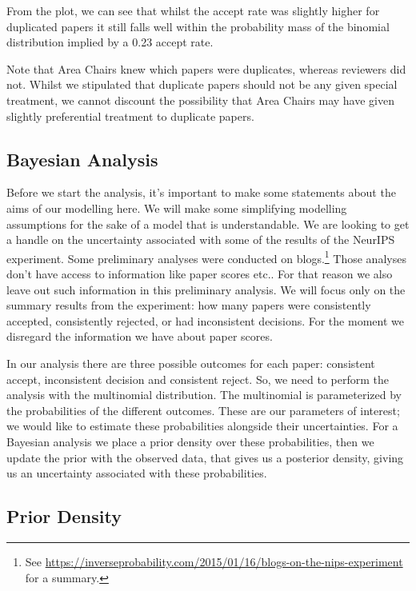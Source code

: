 From the plot, we can see that whilst the accept rate was slightly
higher for duplicated papers it still falls well within the 
probability mass of the binomial distribution implied by a 0.23 accept rate.

Note that Area Chairs knew which papers were duplicates, whereas
reviewers did not. Whilst we stipulated that duplicate papers should not
be any given special treatment, we cannot discount the possibility that
Area Chairs may have given slightly preferential treatment to duplicate
papers.

\subsection{Bayesian Analysis}\label{bayesian-analysis}

Before we start the analysis, it's important to make some statements
about the aims of our modelling here. We will make some simplifying
modelling assumptions for the sake of a model that is understandable. We
are looking to get a handle on the uncertainty associated with some of
the results of the NeurIPS experiment.
Some
preliminary analyses were conducted on blogs.\footnote{See \url{https://inverseprobability.com/2015/01/16/blogs-on-the-nips-experiment} for a summary.} Those
analyses don't have access to information like paper scores etc.. For
that reason we also leave out such information in this preliminary
analysis. We will focus only on the summary results from the experiment:
how many papers were consistently accepted, consistently rejected, or
had inconsistent decisions. For the moment we disregard the information
we have about paper scores.

In our analysis there are three possible outcomes for each paper:
consistent accept, inconsistent decision and consistent reject. So, we
need to perform the analysis with the
multinomial
distribution. The multinomial is parameterized by the probabilities of
the different outcomes. These are our parameters of interest; we would
like to estimate these probabilities alongside their uncertainties. For 
a Bayesian analysis we place a prior density over these
probabilities, then we update the prior with the observed data, that
gives us a posterior density, giving us an uncertainty associated with
these probabilities.

\subsection{Prior Density}\label{prior-density}

